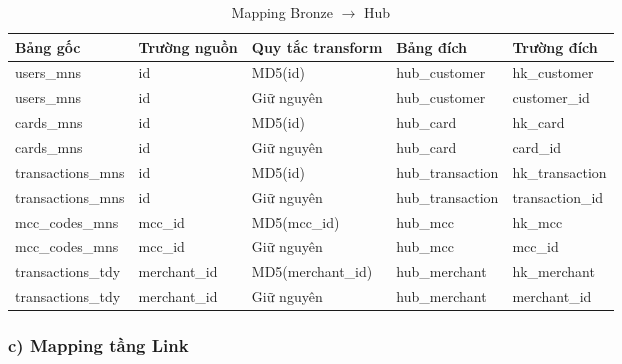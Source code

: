 \begin{table}[H]
\centering
\footnotesize

\begin{tabular}{lllll}
\hline
\textbf{Bảng gốc} & \textbf{Trường nguồn} & \textbf{Quy tắc transform} & \textbf{Bảng đích} & \textbf{Trường đích} \\
\hline
users\_mns        & id          & MD5(id)            & hub\_customer    & hk\_customer    \\
users\_mns        & id          & Giữ nguyên         & hub\_customer    & customer\_id    \\
\hline
cards\_mns        & id          & MD5(id)            & hub\_card        & hk\_card        \\
cards\_mns        & id          & Giữ nguyên         & hub\_card        & card\_id        \\
\hline
transactions\_mns & id          & MD5(id)            & hub\_transaction & hk\_transaction \\
transactions\_mns & id          & Giữ nguyên         & hub\_transaction & transaction\_id \\
\hline
mcc\_codes\_mns   & mcc\_id     & MD5(mcc\_id)       & hub\_mcc         & hk\_mcc         \\
mcc\_codes\_mns   & mcc\_id     & Giữ nguyên         & hub\_mcc         & mcc\_id         \\
\hline
transactions\_tdy & merchant\_id & MD5(merchant\_id) & hub\_merchant    & hk\_merchant    \\
transactions\_tdy & merchant\_id & Giữ nguyên        & hub\_merchant    & merchant\_id    \\
\hline
\end{tabular}
\caption{Mapping Bronze $\rightarrow$ Hub}
\end{table}



\subsubsection*{c) Mapping tầng Link}

